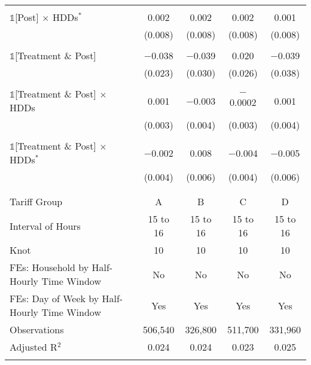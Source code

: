 \begin{table}[!htbp]
\begin{tabular}{@{\extracolsep{30pt}}lcccc}
  & & & & \\ 
 $\mathbb{1}$[Post] $\times$ HDDs$^{*}$ & 0.002 & 0.002 & 0.002 & 0.001 \\ 
  & (0.008) & (0.008) & (0.008) & (0.008) \\ 
  & & & & \\ 
 $\mathbb{1}$[Treatment \& Post] & $-$0.038 & $-$0.039 & 0.020 & $-$0.039 \\ 
  & (0.023) & (0.030) & (0.026) & (0.038) \\ 
  & & & & \\ 
 $\mathbb{1}$[Treatment \& Post] $\times$ HDDs & 0.001 & $-$0.003 & $-$0.0002 & 0.001 \\ 
  & (0.003) & (0.004) & (0.003) & (0.004) \\ 
  & & & & \\ 
 $\mathbb{1}$[Treatment \& Post] $\times$ HDDs$^{*}$ & $-$0.002 & 0.008 & $-$0.004 & $-$0.005 \\ 
  & (0.004) & (0.006) & (0.004) & (0.006) \\ 
  & & & & \\ 
\hline \\[-1.8ex] 
Tariff Group & A & B & C & D \\ 
Interval of Hours & 15 to 16 & 15 to 16 & 15 to 16 & 15 to 16 \\ 
Knot & 10 & 10 & 10 & 10 \\ 
FEs: Household by Half-Hourly Time Window & No & No & No & No \\ 
FEs: Day of Week by Half-Hourly Time Window & Yes & Yes & Yes & Yes \\ 
Observations & 506,540 & 326,800 & 511,700 & 331,960 \\ 
Adjusted R$^{2}$ & 0.024 & 0.024 & 0.023 & 0.025 \\ 
\hline 
\hline \\[-1.8ex] 
\end{tabular} 
\end{table} 
